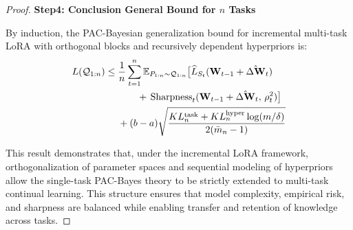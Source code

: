 \documentclass[letterpaper]{article} %
\begin{document}
\begin{proof}
\textbf{Step4: Conclusion General Bound for $n$ Tasks}

By induction, the PAC-Bayesian generalization bound for incremental multi-task LoRA with orthogonal blocks and recursively dependent hyperpriors is:
\begin{align}
        L(\mathcal{Q}_{1:n}) \leq\; & \frac{1}{n} \sum_{t=1}^{n}
        \mathbb{E}_{P_{1:n} \sim \mathcal{Q}_{1:n}}\big[
            \widehat{L}_{S_t}(\mathbf{W}_{t-1} + \hat{\Delta\mathbf{W}}_t) \notag\\
        &\qquad +\, \mathrm{Sharpness}_t(\mathbf{W}_{t-1} + \hat{\Delta\mathbf{W}}_t,\, \rho_t^2)
        \big] \notag\\
        & + (b-a)\sqrt{
            \frac{KL_{n}^{\text{task}} + KL_{n}^{\text{hyper}} \log(m/\delta)}{2(\bar{m}_{n} - 1)}
        }
    \end{align}


 This result demonstrates that, under the incremental LoRA framework, orthogonalization of parameter spaces and sequential modeling of hyperpriors allow the single-task PAC-Bayes theory to be strictly extended to multi-task continual learning. This structure ensures that model complexity, empirical risk, and sharpness are balanced while enabling transfer and retention of knowledge across tasks.




\end{proof}




\end{document}
